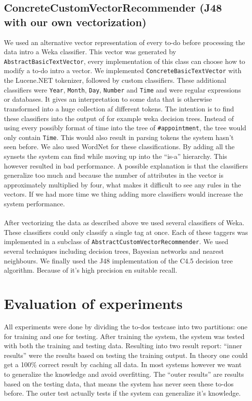\documentclass[a4paper,titlepage]{article}
\begin{document}
\subsection{ConcreteCustomVectorRecommender (J48 with our own vectorization)}
\label{ss:j48alg}
We used an alternative vector representation of every to-do before processing the data intro a Weka classifier. This vector was generated by \texttt{AbstractBasicTextVector}, every implementation of this class can choose how to modify a to-do intro a vector. We implemented \texttt{ConcreteBasicTextVector} with the Lucene.NET tokenizer, followed by custom classifiers. These additional classifiers were \texttt{Year}, \texttt{Month}, \texttt{Day}, \texttt{Number} and \texttt{Time} and were regular expressions or databases. It gives an interpretation to some data that is otherwise transformed into a huge collection af different tokens. The intention is to find these classifiers into the output of for example weka decision trees. Instead of using every possibly format of time into the tree of \texttt{\#appointment}, the tree would only contain \texttt{Time}. This would also result in parsing tokens the system hasn't seen before. We also used WordNet for these classifications. By adding all the synsets the system can find while moving up into the ``is-a'' hierarchy. This however resulted in bad performance. A possible explanation is that the classifiers generalize too much and because the number of attributes in the vector is approximately multiplied by four, what makes it difficult to see any rules in the vectors. If we had more time we thing adding more classifiers would increase the system performance.
\paragraph{}
After vectorizing the data as described above we used several classifiers of Weka. These classifiers could only classify a single tag at once. Each of these taggers was implemented in a subclass of \texttt{AbstractCustomVectorRecommender}. We used several techniques including decision trees, Bayesian networks and nearest neighbours. We finally used the J48 implementation of the C4.5 decision tree algorithm. Because of it's high precision en suitable recall.
\section{Evaluation of experiments}
All experiments were done by dividing the to-dos testcase into two partitions: one for training and one for testing. After training the system, the system was tested with both the training and testing data. Resulting into two result report: ``inner results'' were the results based on testing the training output. In theory one could get a 100\% correct result by caching all data. In most systems however we want to generalize the knowledge and avoid overfitting. The ``outer results'' are results based on the testing data, that means the system has never seen these to-dos before. The outer test actually tests if the system can generalize it's knowledge.
\end{document}
